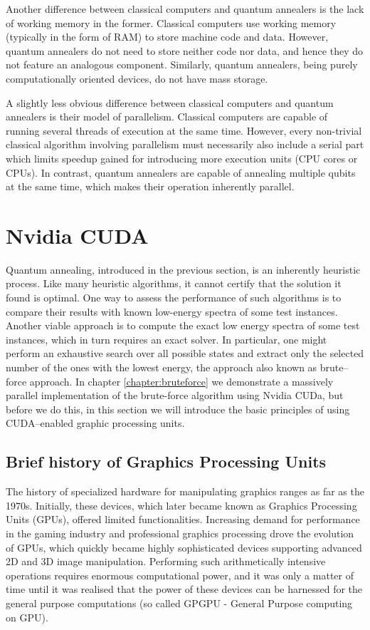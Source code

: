 Another difference between classical computers and quantum annealers is the lack of working memory in the former. Classical computers use working memory (typically in the form of RAM) to store machine code and data. However, quantum annealers do not need to store neither code nor data, and hence they do not feature an analogous component. Similarly, quantum annealers, being purely computationally oriented devices, do not have mass storage.

A slightly less obvious difference between classical computers and quantum annealers is their model
of parallelism. Classical computers are capable of running several threads of execution at the same
time. However, every non-trivial classical algorithm involving parallelism must necessarily also
include a serial part which limits speedup gained for introducing more execution units (CPU cores or
CPUs). In contrast, quantum annealers are capable of annealing multiple qubits at the same time,
which makes their operation inherently parallel.

\section{Nvidia CUDA}

Quantum annealing, introduced in the previous section, is an inherently heuristic process. Like many
heuristic algorithms, it cannot certify that the solution it found is optimal. One way to assess the
performance of such algorithms is to compare their results with known low-energy spectra of some
test instances. Another viable approach is to compute the exact low energy spectra of some test
instances, which in turn requires an exact solver. In particular, one might perform an exhaustive
search over all possible states and extract only the selected number of the ones with the lowest
energy, the approach also known as brute--force approach. In chapter \ref{chapter:bruteforce} we
demonstrate a massively parallel implementation of the brute-force algorithm using Nvidia CUDa, but
before we do this, in this section we will introduce the basic principles of using CUDA--enabled
graphic processing units.

\subsection{Brief history of Graphics Processing Units}
The history of specialized hardware for manipulating graphics ranges as far as the 1970s. Initially,
these devices, which later became known as Graphics Processing Units (GPUs), offered limited
functionalities. Increasing demand for performance in the gaming industry and professional graphics
processing drove the evolution of GPUs, which quickly became highly sophisticated devices supporting
advanced 2D and 3D image manipulation. Performing such arithmetically intensive operations requires
enormous computational power, and it was only a matter of time until it was realised that the
power of these devices can be harnessed for the general purpose computations (so called GPGPU -
General Purpose computing on GPU).

